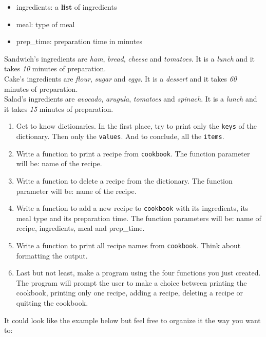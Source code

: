 \documentclass[]{article}
\begin{document}
\begin{itemize}
\item
  ingredients: a \textbf{list} of ingredients
\item
  meal: type of meal
\item
  prep\_time: preparation time in minutes
\end{itemize}

Sandwich's ingredients are \emph{ham}, \emph{bread}, \emph{cheese} and
\emph{tomatoes}. It is a \emph{lunch} and it takes \emph{10} minutes of
preparation.\\
Cake's ingredients are \emph{flour}, \emph{sugar} and \emph{eggs}. It is
a \emph{dessert} and it takes \emph{60} minutes of preparation.\\
Salad's ingredients are \emph{avocado}, \emph{arugula}, \emph{tomatoes}
and \emph{spinach}. It is a \emph{lunch} and it takes \emph{15} minutes
of preparation.

\begin{enumerate}
\def\labelenumi{\arabic{enumi}.}
\item
  Get to know dictionaries. In the first place, try to print only the
  \texttt{keys} of the dictionary. Then only the \texttt{values}. And to
  conclude, all the \texttt{items}.
\item
  Write a function to print a recipe from \texttt{cookbook}. The
  function parameter will be: name of the recipe.
\item
  Write a function to delete a recipe from the dictionary. The function
  parameter will be: name of the recipe.
\item
  Write a function to add a new recipe to \texttt{cookbook} with its
  ingredients, its meal type and its preparation time. The function
  parameters will be: name of recipe, ingredients, meal and prep\_time.
\item
  Write a function to print all recipe names from \texttt{cookbook}.
  Think about formatting the output.
\item
  Last but not least, make a program using the four functions you just
  created. The program will prompt the user to make a choice between
  printing the cookbook, printing only one recipe, adding a recipe,
  deleting a recipe or quitting the cookbook.
\end{enumerate}

It could look like the example below but feel free to organize it the
way you want to:
\end{document}
